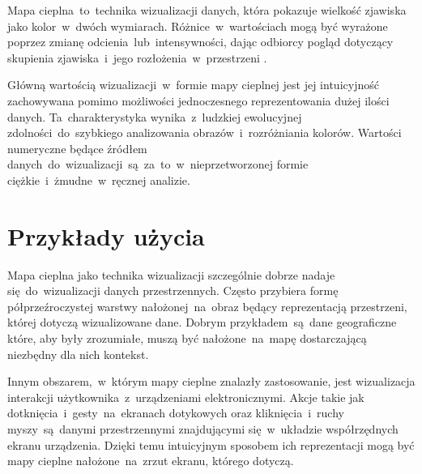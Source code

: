 Mapa cieplna~to~technika wizualizacji danych, która pokazuje wielkość zjawiska jako kolor~w~dwóch wymiarach. Różnice~w~wartościach mogą być wyrażone poprzez zmianę odcienia~lub~intensywności, dając odbiorcy pogląd dotyczący skupienia zjawiska~i~jego rozłożenia~w~przestrzeni \cite{Heat_map_definition}.

Główną wartością wizualizacji~w~formie mapy cieplnej jest jej intuicyjność zachowywana pomimo możliwości jednoczesnego reprezentowania dużej ilości danych. Ta~charakterystyka wynika~z~ludzkiej ewolucyjnej zdolności~do~szybkiego analizowania obrazów~i~rozróżniania kolorów. Wartości numeryczne będące źródłem danych~do~wizualizacji~są~za~to~w~nieprzetworzonej formie ciężkie~i~żmudne~w~ręcznej analizie.

\section{Przykłady użycia}
Mapa cieplna jako technika wizualizacji szczególnie dobrze nadaje się~do~wizualizacji danych przestrzennych. Często przybiera formę półprzeźroczystej warstwy nałożonej~na~obraz będący reprezentacją przestrzeni, której dotyczą wizualizowane dane. Dobrym przykładem~są~dane geograficzne które, aby były zrozumiałe, muszą być nałożone~na~mapę dostarczającą niezbędny dla nich kontekst.

\bigskip
{}

Innym obszarem,~w~którym mapy cieplne znalazły zastosowanie, jest wizualizacja interakcji użytkownika~z~urządzeniami elektronicznymi. Akcje takie jak dotknięcia~i~gesty~na~ekranach dotykowych oraz kliknięcia~i~ruchy myszy~są~danymi przestrzennymi znajdującymi się~w~układzie współrzędnych ekranu urządzenia. Dzięki temu intuicyjnym sposobem ich reprezentacji mogą być mapy cieplne nałożone~na~zrzut ekranu, którego dotyczą.

\bigskip
{}

